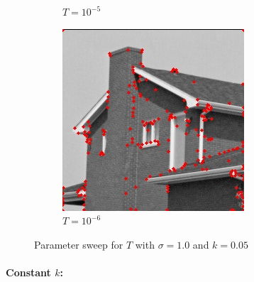 \documentclass[10pt,a4paper,twoside]{article}
\newcommand{\sweepsize}{0.26}
\begin{document}
\begin{figure}[h]
\begin{subfigure}{\sweepsize\textwidth}
    \caption{$T=10^{-5}$}
    \end{subfigure}
    \begin{subfigure}{\sweepsize\textwidth}
    \includegraphics[width=0.9\linewidth, height=0.9\linewidth]{sweep_house/house_10_005_1e-06.jpg} 
    \caption{$T=10^{-6}$}
    \end{subfigure}
    \caption{Parameter sweep for $T$ with $\sigma=1.0$ and $k=0.05$}

\end{figure}

\paragraph*{Constant $k$:}
\end{document}
